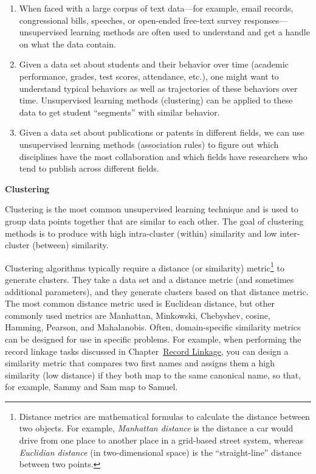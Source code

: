 \documentclass[]{krantz}
\begin{document}
\begin{enumerate}
\def\labelenumi{\arabic{enumi}.}
\item
  When faced with a large corpus of text data---for example, email
  records, congressional bills, speeches, or open-ended free-text survey
  responses---unsupervised learning methods are often used to understand
  and get a handle on what the data contain.
\item
  Given a data set about students and their behavior over time (academic
  performance, grades, test scores, attendance, etc.), one might want to
  understand typical behaviors as well as trajectories of these
  behaviors over time. Unsupervised learning methods (clustering) can be
  applied to these data to get student ``segments'' with similar
  behavior.
\item
  Given a data set about publications or patents in different fields, we
  can use unsupervised learning methods (association rules) to figure
  out which disciplines have the most collaboration and which fields
  have researchers who tend to publish across different fields.
\end{enumerate}

\textbf{Clustering}

Clustering is the most common unsupervised learning technique and is
used to group data points together that are similar to each other. The
goal of clustering methods is to produce with high intra-cluster
(within) similarity and low inter-cluster (between) similarity.

Clustering algorithms typically require a distance (or similarity)
metric\footnote{Distance metrics are mathematical formulas to calculate
  the distance between two objects. For example, \emph{Manhattan
  distance} is the distance a car would drive from one place to another
  place in a grid-based street system, whereas \emph{Euclidian distance}
  (in two-dimensional space) is the ``straight-line'' distance between
  two points.} to generate clusters. They take a data set and a distance
metric (and sometimes additional parameters), and they generate clusters
based on that distance metric. The most common distance metric used is
Euclidean distance, but other commonly used metrics are Manhattan,
Minkowski, Chebyshev, cosine, Hamming, Pearson, and Mahalanobis. Often,
domain-specific similarity metrics can be designed for use in specific
problems. For example, when performing the record linkage tasks
discussed in Chapter~\protect\hyperlink{chap:link}{Record Linkage}, you
can design a similarity metric that compares two first names and assigns
them a high similarity (low distance) if they both map to the same
canonical name, so that, for example, Sammy and Sam map to Samuel.
\end{document}
